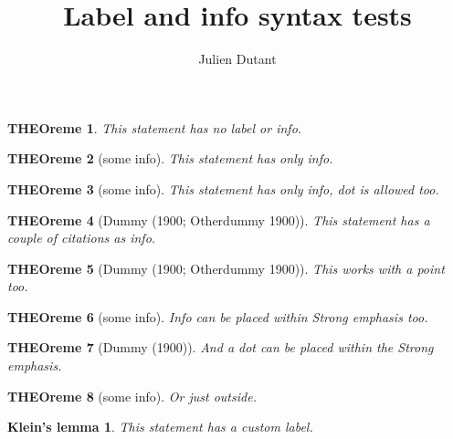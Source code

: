 \documentclass[
]{article}
\title{Label and info syntax tests}
\author{Julien Dutant}
\date{}
\theoremstyle{plain}
\newtheorem{theorem}{THEOreme}
\theoremstyle{plain}
\newtheorem*{klein�__s_lemma}{Klein's lemma}
\theoremstyle{plain}
\theoremstyle{plain}
\theoremstyle{plain}
\theoremstyle{plain}
\theoremstyle{plain}
\theoremstyle{plain}
\theoremstyle{plain}
\begin{document}
\maketitle

\begin{theorem}

This statement has no label or info.

\end{theorem}

\begin{theorem}[some info]

This statement has only info.

\end{theorem}

\begin{theorem}[some info]

This statement has only info, dot is allowed too.

\end{theorem}

\begin{theorem}[Dummy (1900; Otherdummy 1900)]

This statement has a couple of citations as info.

\end{theorem}

\begin{theorem}[Dummy (1900; Otherdummy 1900)]

This works with a point too.

\end{theorem}

\begin{theorem}[some info]

Info can be placed within Strong emphasis too.

\end{theorem}

\begin{theorem}[Dummy (1900)]

And a dot can be placed within the Strong emphasis.

\end{theorem}

\begin{theorem}[some info]

Or just outside.

\end{theorem}

\begin{klein�__s_lemma}

\protect\hypertarget{kleinuxfffd--s-lemma}{}{}This statement has a
custom label.

\end{klein�__s_lemma}
\end{document}
